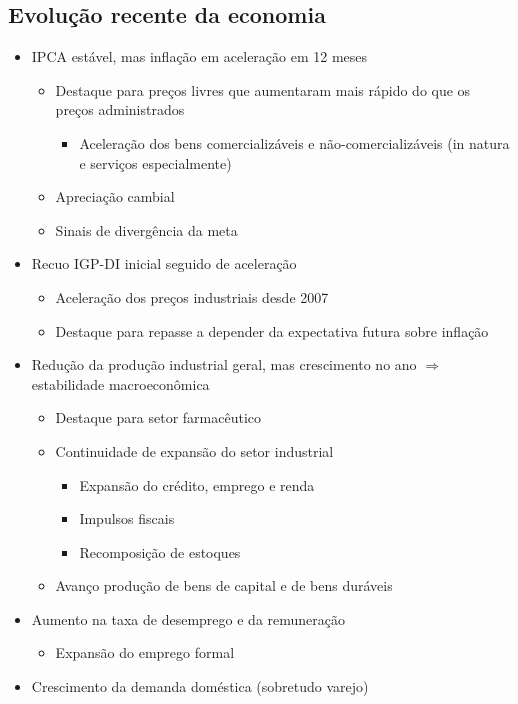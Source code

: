 \documentclass[11pt]{article}
\begin{document}
\subsection*{Evolução recente da economia}
\label{sec:org69fd198}
\begin{itemize}
\item IPCA estável, mas inflação em aceleração em 12 meses
\begin{itemize}
\item Destaque para preços livres que aumentaram mais rápido do que os preços administrados
\begin{itemize}
\item Aceleração dos bens comercializáveis e não-comercializáveis (in natura e serviços especialmente)
\end{itemize}
\item Apreciação cambial
\item Sinais de divergência da meta
\end{itemize}
\item Recuo IGP-DI inicial seguido de aceleração
\begin{itemize}
\item Aceleração dos preços industriais desde 2007
\item Destaque para repasse a depender da expectativa futura sobre inflação
\end{itemize}
\item Redução da produção industrial geral, mas crescimento no ano \(\Rightarrow\) estabilidade macroeconômica
\begin{itemize}
\item Destaque para setor farmacêutico
\item Continuidade de expansão do setor industrial
\begin{itemize}
\item Expansão do crédito, emprego e renda
\item Impulsos fiscais
\item Recomposição de estoques
\end{itemize}
\item Avanço produção de bens de capital e de bens duráveis
\end{itemize}
\item Aumento na taxa de desemprego e da remuneração
\begin{itemize}
\item Expansão do emprego formal
\end{itemize}
\item Crescimento da demanda doméstica (sobretudo varejo)

\end{itemize}
\end{document}

